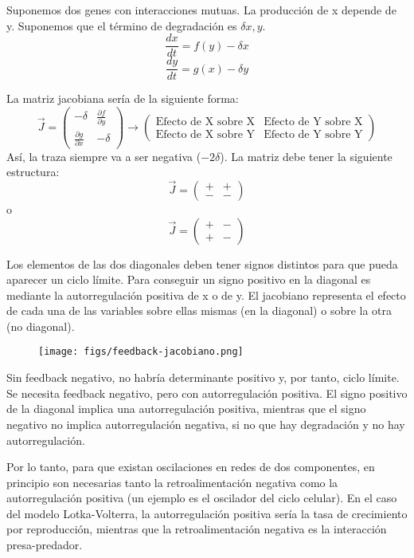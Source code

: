 Suponemos dos genes con interacciones mutuas. La producción de x depende de y. Suponemos que el término de degradación es $\delta x,y$.
$$\frac{dx}{dt} = f(y) - \delta x$$
$$\frac{dy}{dt} = g(x) - \delta y$$

La matriz jacobiana sería de la siguiente forma:
$$\vec{J} = \begin{pmatrix}
- \delta & \frac{\partial f}{\partial y} \\
\frac{\partial g}{\partial x} & - \delta
\end{pmatrix} \rightarrow \begin{pmatrix}
\text{Efecto de X sobre X} & \text{Efecto de Y sobre X} \\
\text{Efecto de X sobre Y} & \text{Efecto de Y sobre Y}
\end{pmatrix}$$
Así, la traza siempre va a ser negativa ($-2 \delta$). La matriz debe tener la siguiente estructura:
$$\vec{J} = \begin{pmatrix}
+ & + \\
- & -
\end{pmatrix}$$
o
$$\vec{J} = \begin{pmatrix}
+ & - \\
+ & -
\end{pmatrix}$$

Los elementos de las dos diagonales deben tener signos distintos para que pueda aparecer un ciclo límite. Para conseguir un signo positivo en la diagonal es mediante la autorregulación positiva de x o de y. El jacobiano representa el efecto de cada una de las variables sobre ellas mismas (en la diagonal) o sobre la otra (no diagonal).

\begin{figure}[h]
\centering
\texttt{[image: figs/feedback-jacobiano.png]}
\end{figure}

Sin feedback negativo, no habría determinante positivo y, por tanto, ciclo límite. Se necesita feedback negativo, pero con autorregulación positiva. El signo positivo de la diagonal implica una autorregulación positiva, mientras que el signo negativo no implica autorregulación negativa, si no que hay degradación y no hay autorregulación. 

Por lo tanto, para que existan oscilaciones en redes de dos componentes, en principio son necesarias tanto la retroalimentación negativa como la autorregulación positiva (un ejemplo es el oscilador del ciclo celular). En el caso del modelo Lotka-Volterra, la autorregulación positiva sería la tasa de crecimiento por reproducción, mientras que la retroalimentación negativa es la interacción presa-predador. 

